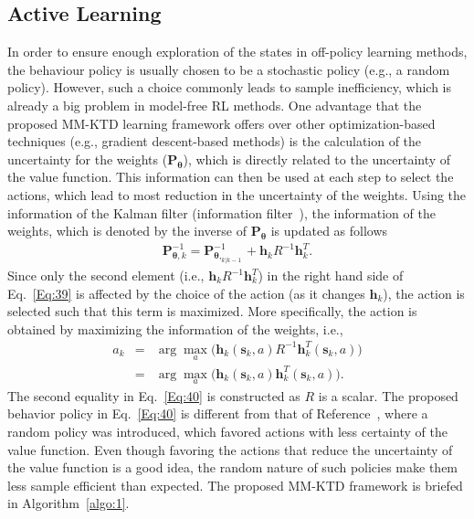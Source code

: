 \documentclass{ieeeaccess}
\def\MMK{\text{MM-KTD}}
\def\k{_{k}}
\def\bt{\bm{\theta}}
\def\h{\bm{h}}
\def\P{\bm{P}}
\def\s{\bm{s}}
\def\kpk{_{k|k-1}}
\begin{document}
\subsection{Active Learning}
In order to ensure enough exploration of the  states in off-policy learning methods, the behaviour policy is usually chosen to be a stochastic policy (e.g., a random policy). However, such a choice commonly leads to sample inefficiency, which is already a big problem in model-free RL methods. One advantage that the proposed $\MMK$ learning framework offers over other optimization-based techniques (e.g., gradient descent-based methods) is the calculation of the uncertainty for the weights ($\P_{\bt}$), which is directly related to the uncertainty of the value function. This information can then be used at each step to select the actions, which  lead to most reduction in the uncertainty of the weights. Using the information of the Kalman filter (information filter~\cite{AK2}), the information of the weights, which is denoted by the inverse of $\P_{\bt}$ is updated as follows
%
\begin{eqnarray}
\P^{-1}_{\bt,k} = \P^{-1}_{\bt,\kpk} +\h\k R^{-1}\h\k^T. \label{Eq:39}
\end{eqnarray}
%
Since only the second element (i.e., $\h\k R^{-1}\h^T\k$) in the right hand side of Eq.~\eqref{Eq:39} is affected by the choice of the action (as it changes $\h\k$), the action is selected such that this term is maximized. More specifically, the action is obtained by maximizing the information of the weights, i.e.,
%
\begin{eqnarray}
a\k &=& \arg\max_a \Big(\h\k (\s\k,a)R^{-1}\h^T\k(\s\k, a) \Big)\nonumber\\
&=&\arg\max_a \Big(\h\k (\s\k,a)\h^T\k(\s\k, a) \Big).\label{Eq:40}
\end{eqnarray}
%
The second equality in Eq.~\eqref{Eq:40} is constructed as $R$ is a scalar. The proposed behavior policy in Eq.~\eqref{Eq:40} is different from that of Reference~\cite{23}, where a random policy was introduced, which favored actions with less certainty of the value function. Even though favoring the actions that reduce the uncertainty of the value function is a good idea, the random nature of such policies make them less sample efficient than expected. The proposed $\MMK$ framework is briefed in Algorithm~\ref{algo:1}.
\end{document}
